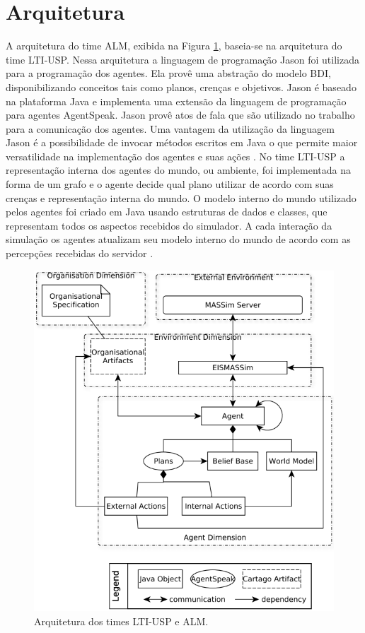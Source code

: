 \documentclass{llncs}
\begin{document}
\section{Arquitetura}

A arquitetura do time ALM, exibida na Figura \ref{fig:arquitetura}, baseia-se na arquitetura do time LTI-USP. Nessa arquitetura a linguagem de programação Jason foi utilizada para a programação dos agentes. Ela provê uma abstração do modelo BDI, disponibilizando conceitos tais como planos, crenças e objetivos. Jason é baseado na plataforma Java e implementa uma extensão da linguagem de programação para agentes AgentSpeak. Jason provê atos de fala que são utilizado no trabalho para a comunicação dos agentes. Uma vantagem da utilização da linguagem Jason é a possibilidade de invocar métodos escritos em Java o que permite maior versatilidade na implementação dos agentes e suas ações \cite{bordini2007jason}. No time LTI-USP a representação interna dos agentes do mundo, ou ambiente, foi implementada na forma de um grafo e o agente decide qual plano utilizar de acordo com suas crenças e representação interna do mundo. O modelo interno do mundo utilizado pelos agentes foi criado em Java usando estruturas de dados e classes, que representam todos os aspectos recebidos do simulador. A cada interação da simulação os agentes atualizam seu modelo interno do mundo de acordo com as percepções recebidas do servidor \cite{ltiusp2012}.

\begin{figure}[!ht]
\centering
\includegraphics[width=0.7\linewidth]{./images/arquitetura.png}
\caption{Arquitetura dos times LTI-USP e ALM.}
\label{fig:arquitetura}
\end{figure}
\end{document}
